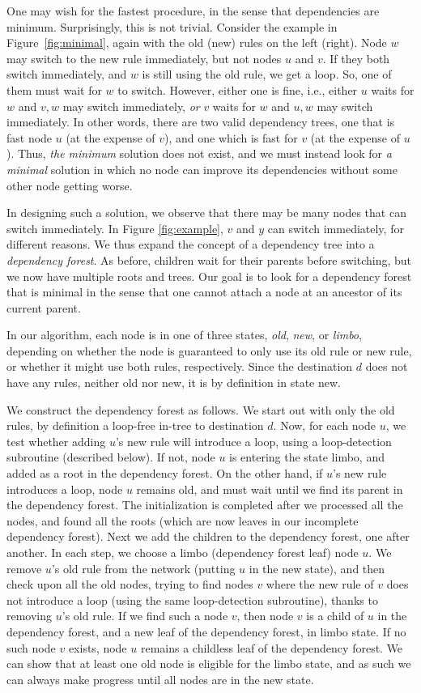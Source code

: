 One may wish for the fastest procedure, in the sense that dependencies are minimum. Surprisingly, this is not trivial. Consider the example in Figure~\ref{fig:minimal}, again with the old (new) rules on the left (right). Node $w$ may switch to the new rule immediately, but not nodes $u$ and $v$. If they both switch immediately, and $w$ is still using the old rule, we get a loop. So, one of them must wait for $w$ to switch. However, either one is fine, i.e., either $u$ waits for $w$ and $v,w$ may switch immediately, \emph{or} $v$ waits for $w$ and $u,w$ may switch immediately. In other words, there are two valid dependency trees, one that is fast node $u$ (at the expense of $v$), and one which is fast for $v$ (at the expense of $u$).
Thus, \emph{the minimum} solution does not exist, and we must instead look for \emph{a minimal} solution in which no node can improve its dependencies without some other node getting worse.

In designing such a solution, we observe that there may be many nodes that can switch immediately. In Figure \ref{fig:example}, $v$ and $y$ can switch immediately, for different reasons. We thus expand the concept of a dependency tree into a \emph{dependency forest}. As before, children wait for their parents before switching, but we now have multiple roots and trees. Our goal is to look for a dependency forest that is minimal in the sense that one cannot attach a node at an ancestor of its current parent.

In our algorithm, each node is in one of three states, \emph{old}, \emph{new}, or \emph{limbo}, depending on whether the node is guaranteed to only use its old rule or new rule, or whether it might use both rules, respectively. Since the destination $d$ does not have any rules, neither old nor new, it is by definition in state new.


We construct the dependency forest as follows. We start out with only the old rules, by definition a loop-free in-tree to destination $d$. Now, for each node $u$, we test whether adding $u$'s new rule will introduce a loop, using a loop-detection subroutine (described below). If not, node $u$ is entering the state limbo, and added as a root in the dependency forest. On the other hand, if $u$'s new rule introduces a loop, node $u$ remains old, and must wait until we find its parent in the dependency forest. The initialization is completed after we processed all the nodes, and found all the roots (which are now leaves in our incomplete dependency forest). Next we add the children to the dependency forest, one after another. In each step, we choose a limbo (dependency forest leaf) node $u$. We remove $u$'s old rule from the network (putting $u$ in the new state), and then check upon all the old nodes, trying to find nodes $v$ where the new rule of $v$ does not introduce a loop (using the same loop-detection subroutine), thanks to removing $u$'s old rule. If we find such a node $v$, then node $v$ is a child of $u$ in the dependency forest, and a new leaf of the dependency forest, in limbo state. If no such node $v$ exists, node $u$ remains a childless leaf of the dependency forest. We can show that at least one old node is eligible for the limbo state,
and as such we can always make progress until all nodes are in the new state.

